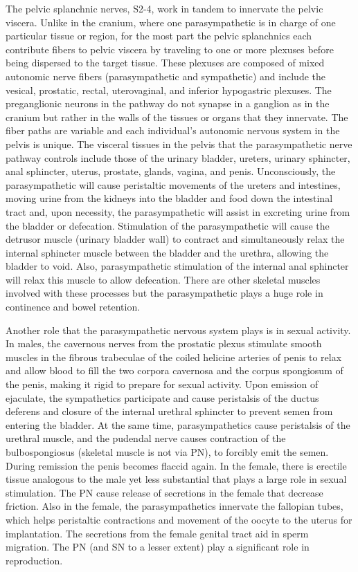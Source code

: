 The pelvic splanchnic nerves, S2-4, work in tandem to innervate the pelvic viscera. Unlike in the cranium, where one parasympathetic is in charge of one particular tissue or region, for the most part the pelvic splanchnics each contribute fibers to pelvic viscera by traveling to one or more plexuses before being dispersed to the target tissue. These plexuses are composed of mixed autonomic nerve fibers (parasympathetic and sympathetic) and include the vesical, prostatic, rectal, uterovaginal, and inferior hypogastric plexuses. The preganglionic neurons in the pathway do not synapse in a ganglion as in the cranium but rather in the walls of the tissues or organs that they innervate. The fiber paths are variable and each individual's autonomic nervous system in the pelvis is unique. The visceral tissues in the pelvis that the parasympathetic nerve pathway controls include those of the urinary bladder, ureters, urinary sphincter, anal sphincter, uterus, prostate, glands, vagina, and penis. Unconsciously, the parasympathetic will cause peristaltic movements of the ureters and intestines, moving urine from the kidneys into the bladder and food down the intestinal tract and, upon necessity, the parasympathetic will assist in excreting urine from the bladder or defecation. Stimulation of the parasympathetic will cause the detrusor muscle (urinary bladder wall) to contract and simultaneously relax the internal sphincter muscle between the bladder and the urethra, allowing the bladder to void. Also, parasympathetic stimulation of the internal anal sphincter will relax this muscle to allow defecation. There are other skeletal muscles involved with these processes but the parasympathetic plays a huge role in continence and bowel retention.

Another role that the parasympathetic nervous system plays is in sexual activity. In males, the cavernous nerves from the prostatic plexus stimulate smooth muscles in the fibrous trabeculae of the coiled helicine arteries of penis to relax and allow blood to fill the two corpora cavernosa and the corpus spongiosum of the penis, making it rigid to prepare for sexual activity. Upon emission of ejaculate, the sympathetics participate and cause peristalsis of the ductus deferens and closure of the internal urethral sphincter to prevent semen from entering the bladder. At the same time, parasympathetics cause peristalsis of the urethral muscle, and the pudendal nerve causes contraction of the bulbospongiosus (skeletal muscle is not via PN), to forcibly emit the semen. During remission the penis becomes flaccid again. In the female, there is erectile tissue analogous to the male yet less substantial that plays a large role in sexual stimulation. The PN cause release of secretions in the female that decrease friction. Also in the female, the parasympathetics innervate the fallopian tubes, which helps peristaltic contractions and movement of the oocyte to the uterus for implantation. The secretions from the female genital tract aid in sperm migration. The PN (and SN to a lesser extent) play a significant role in reproduction.

